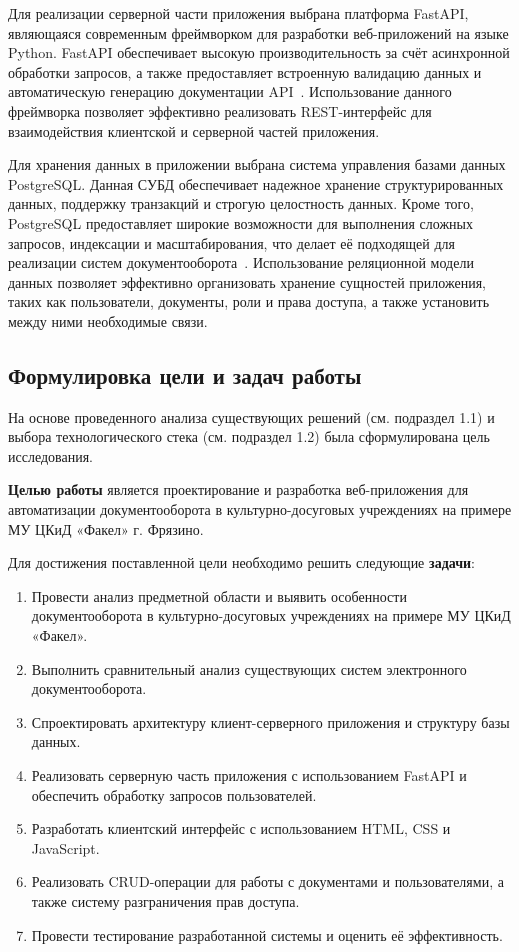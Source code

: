 Для реализации серверной части приложения выбрана платформа FastAPI, являющаяся современным фреймворком для разработки веб-приложений на языке Python. FastAPI обеспечивает высокую производительность за счёт асинхронной обработки запросов, а также предоставляет встроенную валидацию данных и автоматическую генерацию документации API~\cite{fastapi_docs}. Использование данного фреймворка позволяет эффективно реализовать REST-интерфейс для взаимодействия клиентской и серверной частей приложения.

Для хранения данных в приложении выбрана система управления базами данных PostgreSQL. Данная СУБД обеспечивает надежное хранение структурированных данных, поддержку транзакций и строгую целостность данных. Кроме того, PostgreSQL предоставляет широкие возможности для выполнения сложных запросов, индексации и масштабирования, что делает её подходящей для реализации систем документооборота~\cite{postgres_docs}. Использование реляционной модели данных позволяет эффективно организовать хранение сущностей приложения, таких как пользователи, документы, роли и права доступа, а также установить между ними необходимые связи.

\subsection{Формулировка цели и задач работы}

На основе проведенного анализа существующих решений (см. подраздел 1.1) и выбора технологического стека (см. подраздел 1.2) была сформулирована цель исследования.

\textbf{Целью работы} является проектирование и разработка веб-приложения для автоматизации документооборота в культурно-досуговых учреждениях на примере МУ ЦКиД «Факел» г. Фрязино.

Для достижения поставленной цели необходимо решить следующие \textbf{задачи}:
\begin{enumerate}
\item Провести анализ предметной области и выявить особенности документооборота в культурно-досуговых учреждениях на примере МУ ЦКиД «Факел».
\item Выполнить сравнительный анализ существующих систем электронного документооборота.
\item Спроектировать архитектуру клиент-серверного приложения и структуру базы данных.
\item Реализовать серверную часть приложения с использованием FastAPI и обеспечить обработку запросов пользователей.
\item Разработать клиентский интерфейс с использованием HTML, CSS и JavaScript.
\item Реализовать CRUD-операции для работы с документами и пользователями, а также систему разграничения прав доступа.
\item Провести тестирование разработанной системы и оценить её эффективность.
\end{enumerate}